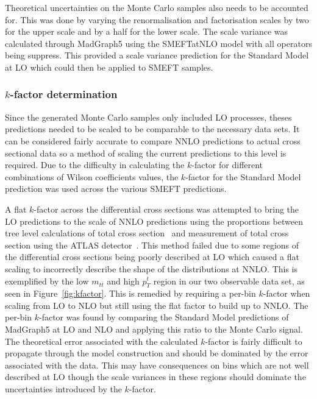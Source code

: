 \documentclass[a4paper,11pt]{article}
\begin{document}
Theoretical uncertainties on the Monte Carlo samples also needs to be accounted for.
This was done by varying the renormalisation and factorisation scales by two for the upper scale and by a half for the lower scale.
The scale variance was calculated through MadGraph5 using the SMEFTatNLO model with all operators being suppress.
This provided a scale variance prediction for the Standard Model at LO which could then be applied to SMEFT samples.

\subsubsection{\texorpdfstring{$k$}{k}-factor determination}
Since the generated Monte Carlo samples only included LO processes, theses predictions needed to be scaled to be comparable to the necessary data sets.
It can be considered fairly accurate to compare NNLO predictions to actual cross sectional data so a method of scaling the current predictions to this level is required.
Due to the difficulty in calculating the $k$-factor for different combinations of Wilson coefficients values, the $k$-factor for the Standard Model prediction was used across the various SMEFT predictions.

A flat $k$-factor across the differential cross sections was attempted to bring the LO predictions to the scale of NNLO predictions using the proportions between tree level calculations of total cross section~\cite{Alwall_2014} and measurement of total cross section using the ATLAS detector~\cite{ATLAS:2019hxz}.
This method failed due to some regions of the differential cross sections being poorly described at LO which caused a flat scaling to incorrectly describe the shape of the distributions at NNLO.
This is exemplified by the low $m_{t\bar{t}}$ and high $p_{T}^{t}$ region in our two observable data set, as seen in Figure~\ref{fig:kfactor}.
This is remedied by requiring a per-bin $k$-factor when scaling from LO to NLO but still using the flat factor to build up to NNLO.
The per-bin $k$-factor was found by comparing the Standard Model predictions of MadGraph5 at LO and NLO and applying this ratio to the Monte Carlo signal.
The theoretical error associated with the calculated $k$-factor is fairly difficult to propagate through the model construction and should be dominated by the error associated with the data.
This may have consequences on bins which are not well described at LO though the scale variances in these regions should dominate the uncertainties introduced by the $k$-factor.
\end{document}
